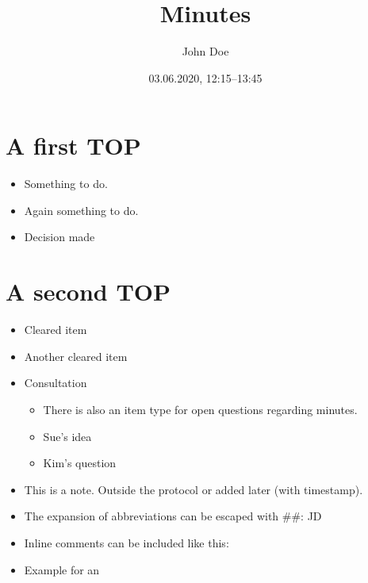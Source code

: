 \documentclass[11pt]{article}
\author{John Doe}
\date{03.06.2020, 12:15--13:45}
\title{Minutes}
\begin{document}
\maketitle
\tableofcontents

\section{\texorpdfstring{}{}A first TOP}
\label{sec:orgaed7643}
\begin{itemize}
\item {} Something to do.
\item \ActionTag{}{::} \ActionTagMargin{}Again something to do.
\item \EntscheidungTag{}{::} \EntscheidungTagMargin{ }Decision made
\end{itemize}
\section{A second TOP}
\label{sec:orga0320ed}
\begin{itemize}
\item {} Cleared item
\item \ClearedTag{}{::} \ClearedTagMargin{ }Another cleared item
\item \ConsultationTag{}{::} \ConsultationTagMargin{ }Consultation 
\begin{itemize}
\item \QuestionTag{}{::}There is also an item type for open questions regarding minutes.
\item {}Sue's idea
\item {}Kim's question
\end{itemize}
\item \NoteTag{\textit{{[}2020-06-03 Wed 10:39]}}{}{::}This is a note. Outside the protocol or added later (with timestamp).
\item The expansion of abbreviations can be escaped with \#{}\#: JD
\item Inline comments can be included like this: 
\item Example for an 
\end{itemize}
\end{document}
